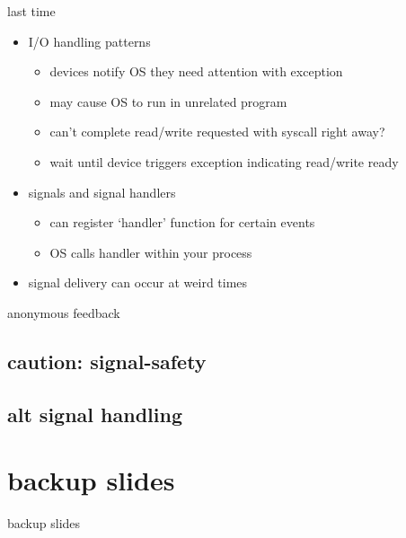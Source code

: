 \date{}
\title{}
\date{}

\begin{frame}
    \titlepage
\end{frame}



\begin{frame}{last time}
    \begin{itemize}
    \item I/O handling patterns
        \begin{itemize}
        \item devices notify OS they need attention with exception
        \item may cause OS to run in unrelated program
        \item can't complete read/write requested with syscall right away?
        \item wait until device triggers exception indicating read/write ready
        \end{itemize}
    \item signals and signal handlers
        \begin{itemize}
        \item can register `handler' function for certain events
        \item OS calls handler within your process
        \end{itemize}
    \item signal delivery can occur at weird times
    \end{itemize}
\end{frame}

\begin{frame}{anonymous feedback}
\end{frame}

\subsection{caution: signal-safety}


\subsection{alt signal handling}




\section{backup slides}
\begin{frame}{backup slides}
\end{frame}






